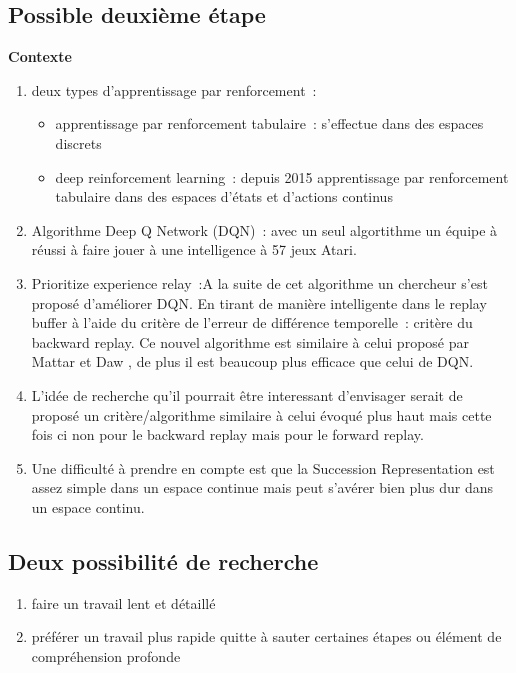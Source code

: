 \documentclass{article}
\begin{document}
\subsection{Possible deuxième étape}
\textbf{Contexte}
\begin{enumerate}
    \item deux types d’apprentissage par renforcement :
    \begin{itemize}
        \item apprentissage par renforcement tabulaire : s’effectue dans des espaces discrets
        \item deep reinforcement learning : depuis 2015 apprentissage par renforcement tabulaire dans des espaces d’états et d’actions continus
    \end{itemize}
    \item Algorithme Deep Q Network (DQN) : avec un seul algortithme un équipe à réussi à faire jouer à une intelligence à 57 jeux Atari. 
    \item Prioritize experience relay :A la suite de cet algorithme  un chercheur s’est proposé d’améliorer DQN. En tirant de manière intelligente dans le replay buffer à l’aide du critère de l’erreur de différence  temporelle : critère du backward replay.  Ce nouvel algorithme est similaire à celui proposé par Mattar et Daw , de plus il est beaucoup plus efficace que celui de DQN.

\item L’idée de recherche qu’il pourrait être interessant d’envisager serait de proposé un critère/algorithme similaire à celui évoqué plus haut mais cette fois ci non pour le backward replay mais pour le forward replay.

\item Une difficulté à prendre en compte est que la Succession Representation est assez simple dans un espace continue mais peut s’avérer bien plus dur dans un espace continu.
\end{enumerate}
\subsection{Deux possibilité de recherche}
\begin{enumerate}
    \item faire un travail lent et détaillé
    \item préférer un travail plus rapide quitte à sauter certaines étapes ou élément de compréhension profonde
\end{enumerate}
\end{document}
